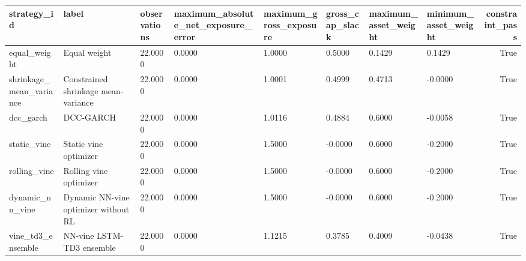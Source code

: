 \begin{tabular}{llllllllr}
\toprule
strategy\_id & label & observations & maximum\_absolute\_net\_exposure\_error & maximum\_gross\_exposure & gross\_cap\_slack & maximum\_asset\_weight & minimum\_asset\_weight & constraint\_pass \\
\midrule
equal\_weight & Equal weight & 22.0000 & 0.0000 & 1.0000 & 0.5000 & 0.1429 & 0.1429 & True \\
shrinkage\_mean\_variance & Constrained shrinkage mean-variance & 22.0000 & 0.0000 & 1.0001 & 0.4999 & 0.4713 & -0.0000 & True \\
dcc\_garch & DCC-GARCH & 22.0000 & 0.0000 & 1.0116 & 0.4884 & 0.6000 & -0.0058 & True \\
static\_vine & Static vine optimizer & 22.0000 & 0.0000 & 1.5000 & -0.0000 & 0.6000 & -0.2000 & True \\
rolling\_vine & Rolling vine optimizer & 22.0000 & 0.0000 & 1.5000 & -0.0000 & 0.6000 & -0.2000 & True \\
dynamic\_nn\_vine & Dynamic NN-vine optimizer without RL & 22.0000 & 0.0000 & 1.5000 & -0.0000 & 0.6000 & -0.2000 & True \\
vine\_td3\_ensemble & NN-vine LSTM-TD3 ensemble & 22.0000 & 0.0000 & 1.1215 & 0.3785 & 0.4009 & -0.0438 & True \\
\bottomrule
\end{tabular}
